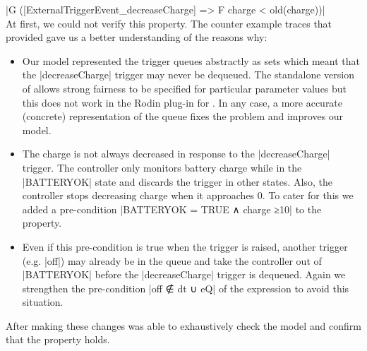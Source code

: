 	|G ([ExternalTriggerEvent_decreaseCharge] => F {charge < old(charge)})|
\\
At first, we could not verify this property.
The counter example traces that \PROB provided gave us a better understanding of the reasons why:
\begin{itemize}
\item
Our model represented the trigger queues abstractly as sets which meant that the |decreaseCharge| trigger may never be dequeued.
The standalone version of \PROB allows strong fairness to be specified for particular parameter values but this does not work in the Rodin plug-in for \PROB. 
In any case, a more accurate (concrete) representation of the queue fixes the problem and improves our model.
\item 
The charge is not always decreased in response to the |decreaseCharge| trigger.
The controller only monitors battery charge while in the |BATTERYOK| state and discards the trigger in other states.
Also, the controller stops decreasing charge when it approaches 0. 
To cater for this we added a pre-condition |BATTERYOK = TRUE ∧ charge ≥10| to the \LTL property.
\item
Even if this pre-condition is true when the trigger is raised, another trigger (e.g. |off|) may already be in the queue and take the controller out of |BATTERYOK| before the |decreaseCharge| trigger is dequeued.
Again we strengthen the pre-condition |off ∉ dt ∪ eQ| of the \LTL expression to avoid this situation.
\\
\end{itemize}
After making these changes \PROB was able to exhaustively check the model and confirm that the \LTL property holds.
